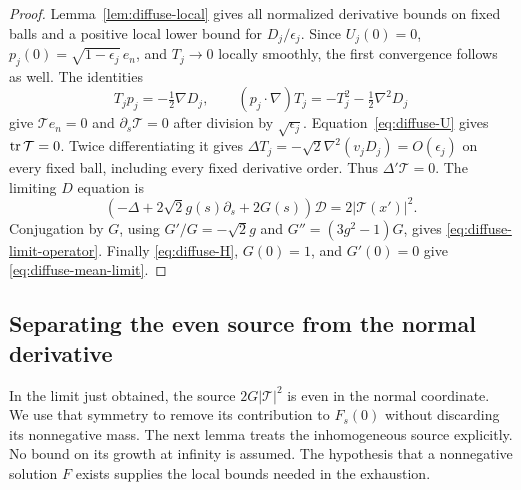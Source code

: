 \begin{proof}
Lemma~\ref{lem:diffuse-local} gives all normalized derivative bounds
on fixed balls and a positive local lower bound for $D_j/\epsilon_j$.
Since $U_j(0)=0$, $p_j(0)=\sqrt{1-\epsilon_j}\,e_n$, and
$T_j\to0$ locally smoothly, the first convergence follows as well.
The identities
\[
 T_jp_j=-\tfrac12\nabla D_j,\qquad
 (p_j\cdot\nabla)T_j=-T_j^2-\tfrac12\nabla^2D_j
\]
give $\mathcal T e_n=0$ and $\partial_s\mathcal T=0$ after division
by $\sqrt{\epsilon_j}$. Equation~\eqref{eq:diffuse-U} gives
$\operatorname{tr}\mathcal T=0$. Twice differentiating it gives
$\Delta T_j=-\sqrt2\nabla^2(v_jD_j)=O(\epsilon_j)$ on every fixed
ball, including every fixed derivative order. Thus $\Delta'\mathcal T=0$.
The limiting $D$ equation is
\[
 (-\Delta+2\sqrt2 g(s)\partial_s+2G(s))\mathcal D
        =2|\mathcal T(x')|^2.
\]
Conjugation by $G$, using $G'/G=-\sqrt2 g$ and
$G''=(3g^2-1)G$, gives \eqref{eq:diffuse-limit-operator}.
Finally \eqref{eq:diffuse-H}, $G(0)=1$, and $G'(0)=0$ give
\eqref{eq:diffuse-mean-limit}.
\end{proof}

\subsection{Separating the even source from the normal derivative}

In the limit just obtained, the source $2G|\mathcal T|^2$ is even
in the normal coordinate. We use that symmetry to remove its
contribution to $F_s(0)$ without discarding its nonnegative mass.
The next lemma treats the inhomogeneous source explicitly. No bound on its
growth at infinity is assumed. The hypothesis that a nonnegative solution
$F$ exists supplies the local bounds needed in the exhaustion.

